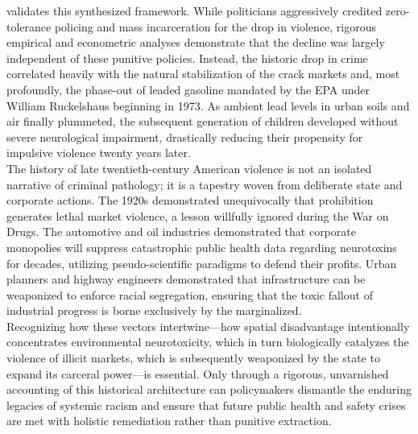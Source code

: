 \documentclass[
]{article}
\newcounter{none} %
\begin{document}
validates this synthesized framework. While politicians aggressively
credited zero-tolerance policing and mass incarceration for the drop in
violence, rigorous empirical and econometric analyses demonstrate that
the decline was largely independent of these punitive policies. Instead,
the historic drop in crime correlated heavily with the natural
stabilization of the crack markets and, most profoundly, the phase-out
of leaded gasoline mandated by the EPA under William Ruckelshaus
beginning in 1973. As ambient lead levels in urban soils and air finally
plummeted, the subsequent generation of children developed without
severe neurological impairment, drastically reducing their propensity
for impulsive violence twenty years later.\\
The history of late twentieth-century American violence is not an
isolated narrative of criminal pathology; it is a tapestry woven from
deliberate state and corporate actions. The 1920s demonstrated
unequivocally that prohibition generates lethal market violence, a
lesson willfully ignored during the War on Drugs. The automotive and oil
industries demonstrated that corporate monopolies will suppress
catastrophic public health data regarding neurotoxins for decades,
utilizing pseudo-scientific paradigms to defend their profits. Urban
planners and highway engineers demonstrated that infrastructure can be
weaponized to enforce racial segregation, ensuring that the toxic
fallout of industrial progress is borne exclusively by the
marginalized.\\
Recognizing how these vectors intertwine---how spatial disadvantage
intentionally concentrates environmental neurotoxicity, which in turn
biologically catalyzes the violence of illicit markets, which is
subsequently weaponized by the state to expand its carceral power---is
essential. Only through a rigorous, unvarnished accounting of this
historical architecture can policymakers dismantle the enduring legacies
of systemic racism and ensure that future public health and safety
crises are met with holistic remediation rather than punitive
extraction.

\nocite{*}
\printbibliography[title={Works cited},sorting=none]
\label{works-cited}
\end{document}
